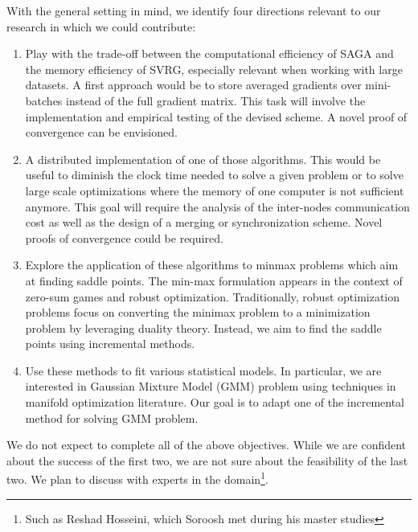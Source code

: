 \documentclass[a4paper,11pt]{article}
\begin{document}
With the general setting in mind, we identify four directions relevant to our
research in which we could contribute:
\begin{enumerate}
	\item Play with the trade-off between the computational efficiency of SAGA
		and the memory efficiency of SVRG, especially relevant when working with
		large datasets. A first approach would be to store averaged gradients
		over mini-batches instead of the full gradient matrix. This task will
		involve the implementation and empirical testing of the devised scheme.
		A novel proof of convergence can be envisioned.
	\item A distributed implementation of one of those algorithms. This would be
		useful to diminish the clock time needed to solve a given problem or to
		solve large scale optimizations where the memory of one computer is not
		sufficient anymore. This goal will require the analysis of the
		inter-nodes communication cost as well as the design of a merging or
		synchronization scheme. Novel proofs of convergence could be required.
	\item Explore the application of these algorithms to minmax problems which
		aim at finding saddle points. The min-max formulation appears in the context of zero-sum games and robust optimization. Traditionally, robust optimization problems focus on converting the minimax problem to a minimization problem by leveraging duality theory. Instead, we aim to find the saddle points using incremental methods.
	\item Use these methods to fit various statistical models. In particular, we are interested in Gaussian Mixture Model (GMM) problem using techniques in manifold optimization literature. Our goal is to adapt one of the incremental method for solving GMM problem. 
\end{enumerate}

We do not expect to complete all of the above objectives. While we are confident
about the success of the first two, we are not sure about the feasibility of the
last two. We plan to discuss with experts in the domain\footnote{Such as Reshad
Hosseini, which Soroosh met during his master studies}.


\printbibliography
\end{document}
